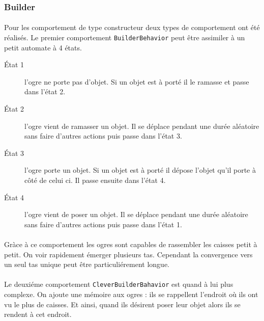 \subsubsection{Builder}
\paragraph{}Pour les comportement de type constructeur deux types de comportement ont été
réalisés. Le premier comportement \texttt{BuilderBehavior} peut être assimiler à un petit automate à 4 états.


\begin{description}
    \item[\'Etat 1] l'ogre ne porte pas d'objet. Si un objet est à porté il
        le ramasse et passe dans l'état 2.
    \item[\'Etat 2] l'ogre vient de ramasser un objet. Il se déplace pendant une
        durée aléatoire sans faire d'autres actions puis passe dans l'état 3.
    \item[\'Etat 3] l'ogre porte un objet. Si un objet est à porté il
        dépose l'objet qu'il porte à côté de celui ci. Il passe ensuite dans
        l'état 4.
    \item[\'Etat 4] l'ogre vient de poser un objet. Il se déplace pendant une
        durée aléatoire sans faire d'autres actions puis passe dans l'état 1.
\end{description}

\paragraph{}Gràce à ce comportement les ogres sont capables de rassembler les caisses
petit à petit. On voir rapidement émerger plusieurs tas. Cependant la
convergence vers un seul tas unique peut être particuliérement longue.

\paragraph{}Le deuxiéme comportement \texttt{CleverBuilderBahavior} est quand à lui plus
complexe. On ajoute une mémoire aux ogres : ils se rappellent l'endroit où ils ont vu le
plus de caisses. Et ainsi, quand ils désirent poser leur objet alors ils se rendent à
cet endroit.

